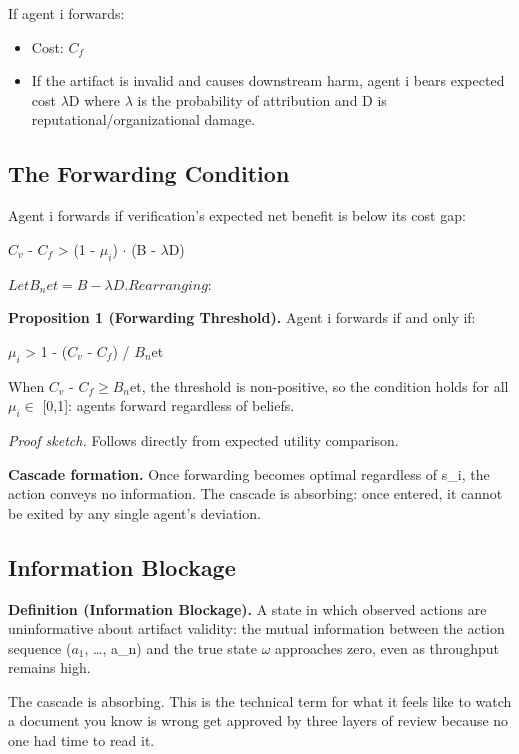 \documentclass[11pt,a4paper]{article}
\providecommand{\tightlist}{\setlength{\itemsep}{0pt}\setlength{\parskip}{0pt}}
\begin{document}
If agent i forwards:

\begin{itemize}
\tightlist
\item
  Cost: $C_f$
\item
  If the artifact is invalid and causes downstream harm, agent i bears expected cost $\lambda$D where $\lambda$ is the probability of attribution and D is reputational/organizational damage.
\end{itemize}

\hypertarget{the-forwarding-condition}{%
\subsection{ The Forwarding Condition}\label{the-forwarding-condition}}

Agent i forwards if verification's expected net benefit is below its cost gap:

$C_v$ - $C_f$ > (1 - $\mu_{i}$) $\cdot$ (B - $\lambda$D)

$Let B_net = B - \lambda D. Rearranging:$

\textbf{Proposition 1 (Forwarding Threshold).} Agent i forwards if and only if:

$\mu_{i}$ > 1 - ($C_v$ - $C_f$) / $B_n$et

When $C_v$ - $C_f \geq B_n$et, the threshold is non-positive, so the condition holds for all $\mu_{i} \in$ {[}0,1{]}: agents forward regardless of beliefs.

\emph{Proof sketch.} Follows directly from expected utility comparison.

\textbf{Cascade formation.} Once forwarding becomes optimal regardless of s\_i, the action conveys no information. The cascade is absorbing: once entered, it cannot be exited by any single agent's deviation.

\hypertarget{information-blockage}{%
\subsection{ Information Blockage}\label{information-blockage}}

\textbf{Definition (Information Blockage).} A state in which observed actions are uninformative about artifact validity: the mutual information between the action sequence ($a_1$, \ldots, a\_n) and the true state $\omega$ approaches zero, even as throughput remains high.

The cascade is absorbing. This is the technical term for what it feels like to watch a document you know is wrong get approved by three layers of review because no one had time to read it.
\end{document}
